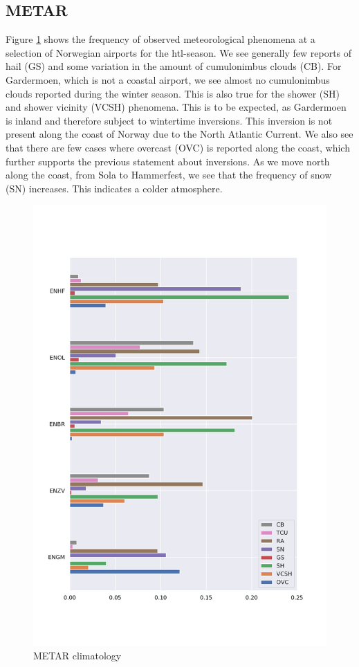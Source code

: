 \subsection{METAR}
Figure \ref{fig:metarclimat} shows the frequency of observed meteorological phenomena at a selection of Norwegian airports for the \acrshort{htl}-season. We see generally few reports of hail (GS) and some variation in the amount of cumulonimbus clouds (CB). For Gardermoen, which is not a coastal airport, we see almost no cumulonimbus clouds reported during the winter season. This is also true for the shower (SH) and shower vicinity (VCSH) phenomena. This is to be expected, as Gardermoen is inland and therefore subject to wintertime inversions. This inversion is not present along the coast of Norway due to the North Atlantic Current. We also see that there are few cases where overcast (OVC) is reported along the coast, which further supports the previous statement about inversions. As we move north along the coast, from Sola to Hammerfest, we see that the frequency of snow (SN) increases. This indicates a colder atmosphere.


\begin{figure}
    \centering
    \includegraphics[width=\textwidth]{Figures/METAR_airports.pdf}
    \caption{METAR climatology}
    \label{fig:metarclimat}
\end{figure}

